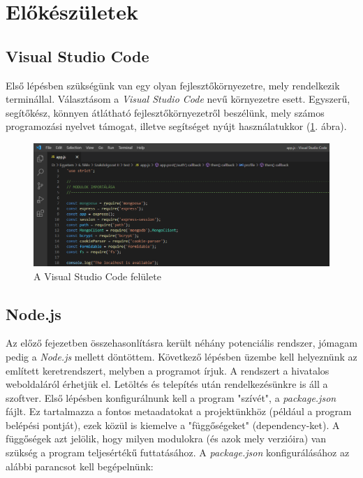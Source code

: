 

\section{Előkészületek}

\subsection{Visual Studio Code}

Első lépésben szükségünk van egy olyan fejlesztőkörnyezetre, mely rendelkezik terminállal. Választásom a \textit{Visual Studio Code} nevű környezetre esett. Egyszerű, segítőkész, könnyen átlátható fejlesztőkörnyezetről beszélünk, mely számos programozási nyelvet támogat, illetve segítséget nyújt használatukkor (\ref{fig:vscode}. ábra).

\begin{figure}[h]
	\centering
		\includegraphics[width=15truecm, height=7truecm]{images/vscode.png}
	\caption{A Visual Studio Code felülete}
	\label{fig:vscode}
\end{figure}

\subsection{Node.js}

Az előző fejezetben összehasonlításra került néhány potenciális rendszer, jómagam pedig a \textit{Node.js} mellett döntöttem. Következő lépésben üzembe kell helyeznünk az említett keretrendszert, melyben a programot írjuk. A rendszert a hivatalos weboldaláról érhetjük el. Letöltés és telepítés után rendelkezésünkre is áll a szoftver. Első lépésben konfigurálnunk kell a program "szívét", a \textit{package.json} fájlt. Ez tartalmazza a fontos metaadatokat a projektünkhöz (például a program belépési pontját), ezek közül is kiemelve a "függőségeket" (dependency-ket). A függőségek azt jelölik, hogy milyen modulokra (és azok mely verzióira) van szükség a program teljesértékű futtatásához. A \textit{package.json} konfigurálásához az alábbi parancsot kell begépelnünk:

